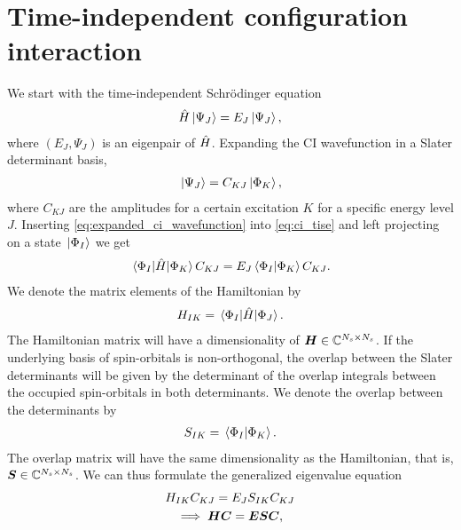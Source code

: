     \section{Time-independent configuration interaction}
        We start with the time-independent Schrödinger equation
        \begin{align}
            \hat{H}\ket*{\Psi_J} = E_J\ket*{\Psi_J},
            \label{eq:ci_tise}
        \end{align}
        where $(E_J, \Psi_J)$ is an eigenpair of $\hat{H}$.
        Expanding the CI wavefunction in a Slater determinant basis,
        \begin{align}
            \ket*{\Psi_J} = C_{KJ}\ket*{\Phi_K},
            \label{eq:expanded_ci_wavefunction}
        \end{align}
        where $C_{KJ}$ are the amplitudes for a certain excitation $K$ for a
        specific energy level $J$.
        Inserting \autoref{eq:expanded_ci_wavefunction} into
        \autoref{eq:ci_tise} and left projecting on a state $\ket*{\Phi_I}$ we
        get
        \begin{align}
            \mel*{\Phi_I}{\hat{H}}{\Phi_K}C_{KJ}
            = E_J\braket*{\Phi_I}{\Phi_K}C_{KJ}.
        \end{align}
        We denote the matrix elements of the Hamiltonian by
        \begin{align}
            H_{IK}
            = \mel*{\Phi_I}{\hat{H}}{\Phi_J}.
        \end{align}
        The Hamiltonian matrix will have a dimensionality of $\boldsymbol{H} \in
        \mathbb{C}^{N_s \times N_s}$.
        If the underlying basis of spin-orbitals is non-orthogonal, the overlap
        between the Slater determinants will be given by the determinant of the
        overlap integrals between the occupied spin-orbitals in both
        determinants.
        We denote the overlap between the determinants by
        \begin{align}
            S_{IK} = \braket*{\Phi_I}{\Phi_K}.
        \end{align}
        The overlap matrix will have the same dimensionality as the Hamiltonian,
        that is, $\boldsymbol{S} \in \mathbb{C}^{N_s \times N_s}$.
        We can thus formulate the generalized eigenvalue equation
        \begin{gather}
            H_{IK}C_{KJ} = E_J S_{IK}C_{KJ}
            \\
            \implies
            \boldsymbol{H} \boldsymbol{C} = \boldsymbol{E} \boldsymbol{S} \boldsymbol{C},
            \label{eq:ci-generalized}
        \end{gather}
